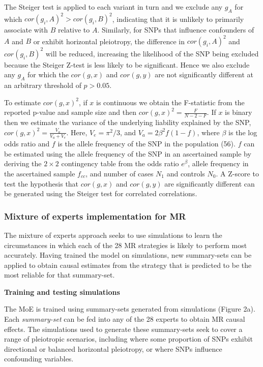 \documentclass[]{article}
\begin{document}
The Steiger test is applied to each variant in turn and we exclude any
\(g_{A}\) for which \(cor(g_{i}, A)^2 > cor(g_{i}, B)^2\), indicating
that it is unlikely to primarily associate with \(B\) relative to \(A\).
Similarly, for SNPs that influence confounders of \(A\) and \(B\) or
exhibit horizontal pleiotropy, the difference in \(cor(g_{i}, A)^2\) and
\(cor(g_{i}, B)^2\) will be reduced, increasing the likelihood of the
SNP being excluded because the Steiger Z-test is less likely to be
significant. Hence we also exclude any \(g_{A}\) for which the
\(cor(g, x)\) and \(cor(g, y)\) are not significantly different at an
arbitrary threshold of \(p > 0.05\).

To estimate \(cor(g, x)^2\), if \(x\) is continuous we obtain the
F-statistic from the reported p-value and sample size and then
\(cor(g, x)^2 = \frac{F}{N - 2 - F}\). If \(x\) is binary then we
estimate the variance of the underlying liability explained by the SNP,
\(cor(g, x)^2 = \frac{V_a}{V_a + V_e}\). Here, \(V_e = \pi^2/3\), and
\(V_a = 2\beta^2f(1-f)\), where \(\beta\) is the log odds ratio and
\(f\) is the allele frequency of the SNP in the population (56). \(f\)
can be estimated using the allele frequency of the SNP in an ascertained
sample by deriving the \(2 \times 2\) contingency table from the odds
ratio \(e^\beta\), allele frequency in the ascertained sample
\(f_{cc}\), and number of cases \(N_1\) and controls \(N_0\). A Z-score
to test the hypothesis that \(cor(g, x)\) and \(cor(g, y)\) are
significantly different can be generated using the Steiger test for
correlated correlations.

\subsubsection{Mixture of experts implementation for
MR}\label{mixture-of-experts-implementation-for-mr}

The mixture of experts approach seeks to use simulations to learn the
circumstances in which each of the 28 MR strategies is likely to perform
most accurately. Having trained the model on simulations, new
summary-sets can be applied to obtain causal estimates from the strategy
that is predicted to be the most reliable for that summary-set.

\textbf{Training and testing simulations}

The MoE is trained using summary-sets generated from simulations (Figure
2a). Each \emph{summary-set} can be fed into any of the 28 experts to
obtain MR causal effects. The simulations used to generate these
summary-sets seek to cover a range of pleiotropic scenarios, including
where some proportion of SNPs exhibit directional or balanced horizontal
pleiotropy, or where SNPs influence confounding variables.
\end{document}
